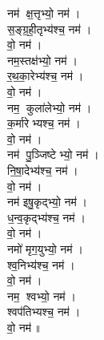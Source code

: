 \begin{multicols}{2}
\begin{flushleft}
नम॑ क्ष॒त्तृभ्यो॒ नम॑।\hfill {}\\
स॒ङ्ग्र॒ही॒तृभ्य॑श्च॒ नम॑।\\
वो॒ नम॑।\\
नम॒स्तक्ष॑भ्यो॒ नम॑।\\
र॒थ॒का॒रेभ्य॑श्च॒ नम॑।\\
वो॒ नम॑।\\
नम॒ कुला॑लेभ्यो॒ नम॑।\\
क॒र्मारेभ्यश्च॒ नम॑।\\
वो॒ नम॑।\\
नम॑ पु॒ञ्जिष्टेभ्यो॒ नम॑।\\
नि॒षा॒देभ्य॑श्च॒ नम॑।\hfill {}\\
वो॒ नम॑।\\
नम॑ इषु॒कृद्भ्यो॒ नम॑।\\
ध॒न्व॒कृद्भ्य॑श्च॒ नम॑।\\
वो॒ नम॑।\\
नमो॑ मृग॒युभ्यो॒ नम॑।\\
श्व॒निभ्य॑श्च॒ नम॑।\\
वो॒ नम॑।\\
नम॒ श्वभ्यो॒ नम॑।\\
श्वप॑तिभ्यश्च॒ नम॑।\\
वो॒ नम॑॥\hfill {}\\


\end{flushleft}
\end{multicols}
